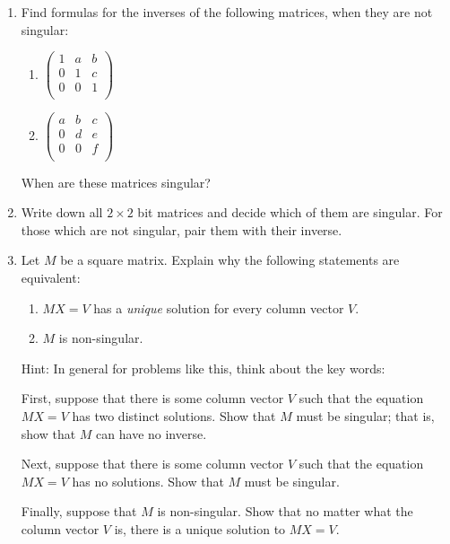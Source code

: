 



\begin{enumerate}

\item Find formulas for the inverses of the following matrices, when they are not singular:
\begin{enumerate}
\item $\begin{pmatrix}
1 & a & b \\
0 & 1 & c \\
0 & 0 & 1 \\
\end{pmatrix}$
\item $\begin{pmatrix}
a & b & c \\
0 & d & e \\
0 & 0 & f \\
\end{pmatrix}$
\end{enumerate}
When are these matrices singular?


\item Write down all $2\times 2$ bit matrices and decide which of them are singular.  For those which are not singular, pair them with their inverse.


\item \label{problem_unique_solution} Let $M$ be a square matrix.  Explain why the following statements are equivalent:
\begin{enumerate}
\item $MX=V$ has a \emph{unique} solution for every column vector $V$.
\item $M$ is non-singular.
\end{enumerate}
Hint: In general for problems like this, think about the key words:

First, suppose that there is some column vector \(V\) such that the equation \(MX=V\) has two distinct solutions. Show that \(M\) must be singular; that is, show that \(M\) can have no inverse.

Next, suppose that there is some column vector \(V\) such that the equation \(MX=V\) has no solutions. Show that \(M\) must be singular.

Finally, suppose that \(M\) is non-singular. Show that no matter what the column vector \(V\) is, there is a unique solution to \(MX=V.\)


\end{enumerate}
